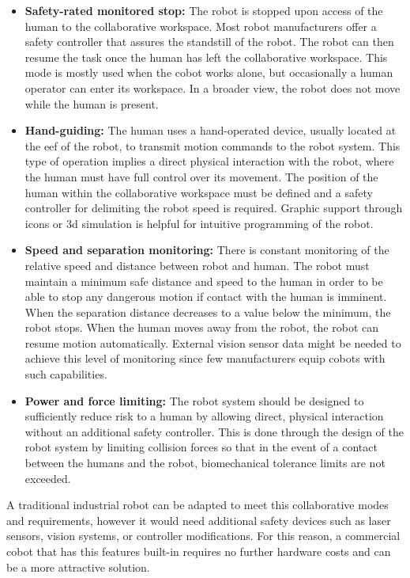 \begin{itemize}
    \item \textbf{Safety-rated monitored stop: }The robot is stopped upon access of the human to the collaborative workspace. Most robot manufacturers offer a safety controller that assures the standstill of the robot. The robot can then resume the task once the human has left the collaborative workspace. This mode is mostly used when the cobot works alone, but occasionally a human operator can enter its workspace. In a broader view, the robot does not move while the human is present.
    \item \textbf{Hand-guiding: }The human uses a hand-operated device, usually located at the \ac{eef} of the robot, to transmit motion commands to the robot system. This type of operation implies a direct physical interaction with the robot, where the human must have full control over its movement. The position of the human within the collaborative workspace must be defined and a safety controller for delimiting the robot speed is required. Graphic support through icons or \acs{3d} simulation is helpful for intuitive programming of the robot.
    \item \textbf{Speed and separation monitoring: }There is constant monitoring of the relative speed and distance between robot and human. The robot must maintain a minimum safe distance and speed to the human in order to be able to stop any dangerous motion if contact with the human is imminent. When the separation distance decreases to a value below the minimum, the robot stops. When the human moves away from the robot, the robot can resume motion automatically. External vision sensor data might be needed to achieve this level of monitoring since few manufacturers equip cobots with such capabilities. 
    \item \textbf{Power and force limiting: }The robot system should be designed to sufficiently reduce risk to a human by allowing direct, physical interaction without an additional safety controller. This is done through the design of the robot system by limiting collision forces so that in the event of a contact between the humans and the robot, biomechanical tolerance limits are not exceeded.
\end{itemize}

\par A traditional industrial robot can be adapted to meet this collaborative modes and requirements, however it would need additional safety devices such as laser sensors, vision systems, or controller modifications. For this reason, a commercial cobot that has this features built-in requires no further hardware costs and can be a more attractive solution.

